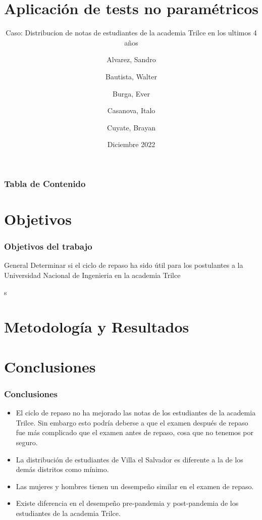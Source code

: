\documentclass{beamer}
\title[PC3 Estadística Aplicada] %
{Aplicación de tests no paramétricos}
\subtitle{
  Caso: Distribucion de notas de estudiantes de la academia
    Trilce en los ultimos 4 años
}
\author %
{
  Alvarez, Sandro \and Bautista, Walter \and Burga, Ever \and
    Casanova, Italo \and  Cuyate, Brayan
}
\institute
{
  Facultad de Ingenieria Industrial y de Sistemas\\
  \textbf{Universidad Nacional de Ingenieria}
}
\date
{Diciembre 2022}
\begin{document}
\frame{\titlepage}


\begin{frame}
\frametitle{Tabla de Contenido}
\tableofcontents
\end{frame}
\section{Objetivos}

\begin{frame}

\frametitle{Objetivos del trabajo}

\begin{alertblock}{General}
  Determinar si el ciclo de repaso ha sido útil para los postulantes a la
  Universidad Nacional de Ingenieria en la academia Trilce
\end{alertblock}
\end{frame}
s

\section{Metodología y Resultados}














\section{Conclusiones}

\begin{frame}
  \frametitle{Conclusiones}
  \begin{itemize}
    \item El ciclo de repaso no ha mejorado las notas de los estudiantes de la academia Trilce. Sin embargo 
    esto podría deberse a que el examen después de repaso fue más complicado que el examen antes de repaso, cosa que no 
    tenemos por seguro. 
    \item La distribución de estudiantes de Villa el Salvador es diferente a la de los demás distritos como mínimo. 
    \item Las mujeres y hombres tienen un desempeño similar en el examen de repaso.
    \item Existe diferencia en el desempeño pre-pandemia y post-pandemia de los estudiantes de la academia Trilce.
  \end{itemize}
\end{frame}
\end{document}
